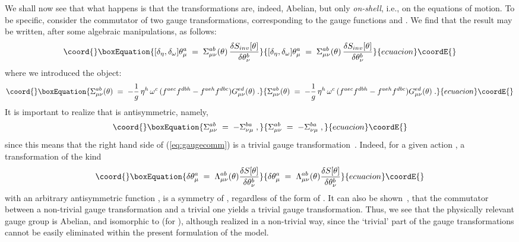 \documentclass[a4paper,12pt]{article}
\begin{document}
We shall now see that what happens is that the transformations  are, 
indeed, Abelian, but only {\em on-shell}, i.e.,
on the equations of motion. 
To be specific, consider the commutator of two gauge transformations, 
corresponding to the gauge functions \myHighlight{$\omega$}\coordHE{} and \myHighlight{$\eta$}\coordHE{}.  We find that the 
result may be written, after some algebraic manipulations, as follows:
\begin{equation}\coord{}\boxEquation{\label{eq:gaugecomm}
[\delta_\eta, \delta_\omega ] \theta_\mu^a \;=\; 
\Sigma_{\mu\nu}^{ab} (\theta) \, \frac{\delta S_{inv}[\theta]}{\delta \theta_\nu^b}
}{[\delta_\eta, \delta_\omega ] \theta_\mu^a \;=\; 
\Sigma_{\mu\nu}^{ab} (\theta) \, \frac{\delta S_{inv}[\theta]}{\delta \theta_\nu^b}
}{ecuacion}\coordE{}\end{equation}
where we introduced the object:
\begin{equation}\coord{}\boxEquation{\label{eq:defsigma}
\Sigma_{\mu\nu}^{ab}(\theta) \;=\; - \frac{1}{g} \,
\eta^h \, \omega^c \, ( f^{aec}   f^{dbh} -   f^{aeh}   f^{dbc})
G_{\mu\nu}^{ed}(\theta) \;. 
}{\Sigma_{\mu\nu}^{ab}(\theta) \;=\; - \frac{1}{g} \,
\eta^h \, \omega^c \, ( f^{aec}   f^{dbh} -   f^{aeh}   f^{dbc})
G_{\mu\nu}^{ed}(\theta) \;. 
}{ecuacion}\coordE{}\end{equation}
It is important to realize that \coordHE{} is antisymmetric,
namely,
\begin{equation}\coord{}\boxEquation{\label{eq:asymm}
\Sigma_{\mu\nu}^{ab} \;=\; -\Sigma_{\nu\mu}^{ba} \;, 
}{\Sigma_{\mu\nu}^{ab} \;=\; -\Sigma_{\nu\mu}^{ba} \;, 
}{ecuacion}\coordE{}\end{equation}
since this means that the right hand side of (\ref{eq:gaugecomm}) is a
trivial gauge transformation~\cite{teit}.
Indeed, for a given action \coordHE{}, a transformation of the kind
\begin{equation}\coord{}\boxEquation{
\delta \theta_\mu^a \;=\; \Lambda_{\mu\nu}^{ab}(\theta) \frac{\delta
S[\theta]}{\delta \theta_\nu^b} 
}{
\delta \theta_\mu^a \;=\; \Lambda_{\mu\nu}^{ab}(\theta) \frac{\delta
S[\theta]}{\delta \theta_\nu^b} 
}{ecuacion}\coordE{}\end{equation}
with an arbitrary antisymmetric function \coordHE{}, is a symmetry of \coordHE{}, regardless  of the 
form of \coordHE{}. It can also be shown~\cite{teit}, that the commutator 
between a non-trivial gauge transformation and a trivial one yields a trivial 
gauge transformation.
Thus, we see that the physically relevant gauge group is Abelian, and
isomorphic to \coordHE{} (for \coordHE{}), although realized in a non-trivial 
way, since the `trivial' part of the gauge transformations cannot be
easily eliminated within the present formulation of the model. 
\end{document}
